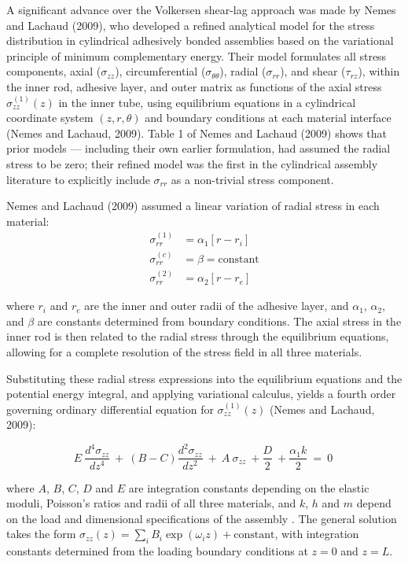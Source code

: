 A significant advance over the Volkersen shear-lag approach was made by Nemes and Lachaud (2009), who developed a refined analytical model for the stress distribution in cylindrical adhesively bonded assemblies based on the variational principle of minimum complementary energy. Their model formulates all stress components, axial ($\sigma_{zz}$), circumferential ($\sigma_{\theta\theta}$), radial ($\sigma_{rr}$), and shear ($\tau_{rz}$), within the inner rod, adhesive layer, and outer matrix as functions of the axial stress $\sigma_{zz}^{(1)}(z)$ in the inner tube, using equilibrium equations in a cylindrical coordinate system $(z, r, \theta)$ and boundary conditions at each material interface (Nemes and Lachaud, 2009). Table 1 of Nemes and Lachaud (2009) shows that prior models — including their own earlier formulation, had assumed the radial stress to be zero; their refined model was the first in the cylindrical assembly literature to explicitly include $\sigma_{rr}$ as a non-trivial stress component.

Nemes and Lachaud (2009) assumed a linear variation of radial stress in each material:
\begin{align}
  \sigma_{rr}^{(1)} &= \alpha_1 \left[ r - r_i \right] \\
  \sigma_{rr}^{(c)} &= \beta = \text{constant} \\
  \sigma_{rr}^{(2)} &= \alpha_2 \left[ r - r_e \right]
\end{align}

where $r_i$ and $r_e$ are the inner and outer radii of the adhesive layer, and $\alpha_1$, $\alpha_2$, and $\beta$ are constants determined from boundary conditions. The axial stress in the inner rod is then related to the radial stress through the equilibrium equations, allowing for a complete resolution of the stress field in all three materials.

Substituting these radial stress expressions into the equilibrium equations and the potential energy integral, and applying variational calculus, yields a fourth order governing ordinary differential equation for $\sigma_{zz}^{(1)}(z)$ (Nemes and Lachaud, 2009):

\begin{equation}
    E\ \frac{d^{4}{\sigma }_{zz}}{dz^{4}}\ +\ \left(B - C\right)\frac{d^{2}{\sigma }_{zz}}{dz^{2}}\ +\ A\ {\sigma }_{zz}\ +\frac{D}{2}\ +\frac{{\alpha }_{1}k}{2}\ =\ 0\ 
\end{equation}

where $A$, $B$, $C$, $D$ and $E$ are integration constants depending on the elastic moduli, Poisson's ratios and radii of all three materials, and $k$, $h$ and $m$ depend on the load and dimensional specifications of the assembly \textcite{nemesModelingCylindricalAdhesively2009}. The general solution takes the form $\sigma_{zz}(z) = \sum_i B_i \exp(\omega_i z) + \text{constant}$, with integration constants determined from the loading boundary conditions at $z = 0$ and $z = L$.

